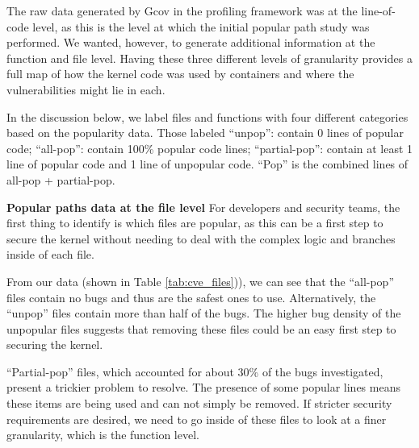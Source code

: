 The raw data generated by Gcov in the profiling framework was at the line-of-code level, as this is the level at which  the initial popular path study \cite{Lock-in-Pop} was performed. 
We wanted, however, to generate  additional information at the function and file level. 
Having these three different levels of granularity provides a full map of how the kernel code was used by containers and where the vulnerabilities might lie in each.

In the discussion below, we label files and functions with four different categories based on the popularity data. 
Those labeled ``unpop'': contain 0 lines of popular code; ``all-pop'': contain 100\% popular code lines; ``partial-pop'': contain at least 1 line of popular code 
and 1 line of unpopular code. ``Pop'' is the combined lines of all-pop + partial-pop.

\noindent
\textbf{Popular paths data at the file level}
\newline
For developers and security teams, the first thing to identify is which files are popular, as this can be a first step to secure the kernel without needing to 
deal with the complex logic and branches inside of each file. 

From our data (shown in Table \ref{tab:cve_files})), we can see that the ``all-pop'' files contain no bugs  and thus are the safest ones to use.  
Alternatively, the  ``unpop'' files contain more than half of the bugs. The higher bug density of the unpopular files suggests that removing these files could be an easy first step to securing the kernel. 

 ``Partial-pop'' files, which accounted for about 30\% of the bugs investigated, present a trickier problem to resolve. 
 The presence of some popular lines means these items are being used and can not simply be removed. If stricter security requirements are desired, 
 we need to go inside of these files to look at a finer granularity, which is the function level. 
 
